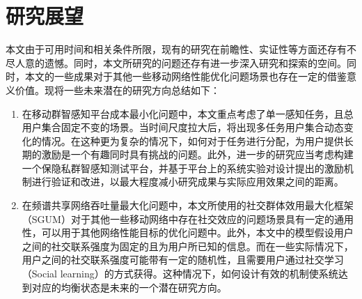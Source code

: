 \section{研究展望}
本文由于可用时间和相关条件所限，现有的研究在前瞻性、实证性等方面还存有不尽人意的遗憾。同时，本文所研究的问题还存有进一步深入研究和探索的空间。同时，本文的一些成果对于其他一些移动网络性能优化问题场景也存在一定的借鉴意义价值。现将一些未来潜在的研究方向总结如下：

\begin{enumerate}
    \item 在移动群智感知平台成本最小化问题中，本文重点考虑了单一感知任务，且总用户集合固定不变的场景。当时间尺度拉大后，将出现多任务用户集合动态变化的情况。在这种更为复杂的情况下，如何对于任务进行分配，为用户提供长期的激励是一个有趣同时具有挑战的问题。此外，进一步的研究应当考虑构建一个保隐私群智感知测试平台，并基于平台上的系统实验对设计提出的激励机制进行验证和改进，以最大程度减小研究成果与实际应用效果之间的距离。
    \item 在频谱共享网络吞吐量最大化问题中，本文所使用的社交群体效用最大化框架（SGUM）对于其他一些移动网络中存在社交效应的问题场景具有一定的通用性，可以用于其他网络性能目标的优化问题中。此外，本文中的模型假设用户之间的社交联系强度为固定的且为用户所已知的信息。而在一些实际情况下，用户之间的社交联系强度可能带有一定的随机性，且需要用户通过社交学习（Social learning）的方式获得。这种情况下，如何设计有效的机制使系统达到对应的均衡状态是未来的一个潜在研究方向。

\end{enumerate}
